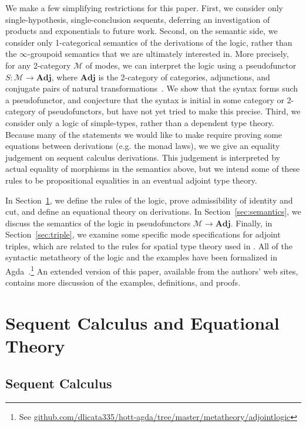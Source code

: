 \documentclass{drl-common/llncs}
\newcommand{\M}{\ensuremath{\mathcal{M}}}
\newcommand{\Adj}{\textbf{Adj}}
\begin{document}
We make a few simplifying restrictions for this paper. First, we
consider only single-hypothesis, single-conclusion sequents, deferring
an investigation of products and exponentials to future work.  Second,
on the semantic side, we consider only 1-categorical semantics of the
derivations of the logic, rather than the $\infty$-groupoid semantics
that we are ultimately interested in.  More precisely, for any
2-category \M\/ of modes, we can interpret the logic using a
pseudofunctor $S : \M \to \Adj$, where $\Adj$ is the 2-category of
categories, adjunctions, and conjugate pairs of natural
transformations~\citep[\S IV.7]{maclane98working}.  We show that the
syntax forms such a pseudofunctor, and conjecture that the syntax is
initial in some category or 2-category of pseudofunctors, but have not
yet tried to make this precise.  Third, we consider only a logic of
simple-types, rather than a dependent type theory.  Because 
many of the statements we would like to make require proving some
equations between derivations (e.g. the monad laws), we we give an
equality judgement on sequent calculus derivations.  This judgement is
interpreted by actual equality of morphisms in the semantics above, but
we intend some of these rules to be propositional equalities in an
eventual adjoint type theory.

In Section~\ref{sec:rules}, we define the rules of the logic, prove
admissibility of identity and cut, and define an equational theory on
derivations.  In Section~\ref{sec:semantics}, we discuss the semantics
of the logic in pseudofunctors $\M \to \Adj$.  Finally, in
Section~\ref{sec:triple}, we examine some specific mode specifications
for adjoint triples, which are related to the rules for spatial type
theory used in \citep{shulman15realcohesion}.  All of the syntactic
metatheory of the logic and the examples have been formalized in
Agda~\citep{norell07thesis}.\footnote{See
  \url{github.com/dlicata335/hott-agda/tree/master/metatheory/adjointlogic}}
An extended version of this paper, available from the authors' web
sites, contains more discussion of the examples, definitions, and proofs.

\section{Sequent Calculus and Equational Theory}
\label{sec:rules}

\subsection{Sequent Calculus}
\end{document}
